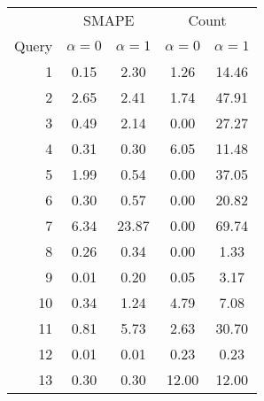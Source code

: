 \begin{tabular}{rcccc}
\toprule
       & \multicolumn{2}{c}{SMAPE}                                & \multicolumn{2}{c}{Count}   \\
Query  & $\alpha = 0$              & $\alpha = 1$                 & $\alpha = 0$ & $\alpha = 1$ \\
\midrule
    1  & 0.15                      & 2.30                         & 1.26            & 14.46     \\
    2  & 2.65                      & 2.41                         & 1.74            & 47.91     \\
    3  & 0.49                      & 2.14                         & 0.00            & 27.27     \\
    4  & 0.31                      & 0.30                         & 6.05            & 11.48     \\
    5  & 1.99                      & 0.54                         & 0.00            & 37.05     \\
    6  & 0.30                      & 0.57                         & 0.00            & 20.82     \\
    7  & 6.34                      & 23.87                        & 0.00            & 69.74     \\
    8  & 0.26                      & 0.34                         & 0.00            & 1.33      \\
    9  & 0.01                      & 0.20                         & 0.05            & 3.17      \\
   10  & 0.34                      & 1.24                         & 4.79            & 7.08      \\
   11  & 0.81                      & 5.73                         & 2.63            & 30.70     \\
   12  & 0.01                      & 0.01                         & 0.23            & 0.23      \\
   13  & 0.30                      & 0.30                         & 12.00           & 12.00     \\
\bottomrule
\end{tabular}
